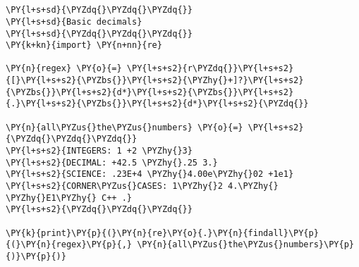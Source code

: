 

\section*{}

\begin{Verbatim}[commandchars=\\\{\}]
\PY{l+s+sd}{\PYZdq{}\PYZdq{}\PYZdq{}}
\PY{l+s+sd}{Basic decimals}
\PY{l+s+sd}{\PYZdq{}\PYZdq{}\PYZdq{}}
\PY{k+kn}{import} \PY{n+nn}{re}

\PY{n}{regex} \PY{o}{=} \PY{l+s+s2}{r\PYZdq{}}\PY{l+s+s2}{[}\PY{l+s+s2}{\PYZbs{}}\PY{l+s+s2}{\PYZhy{}+]?}\PY{l+s+s2}{\PYZbs{}}\PY{l+s+s2}{d*}\PY{l+s+s2}{\PYZbs{}}\PY{l+s+s2}{.}\PY{l+s+s2}{\PYZbs{}}\PY{l+s+s2}{d*}\PY{l+s+s2}{\PYZdq{}}

\PY{n}{all\PYZus{}the\PYZus{}numbers} \PY{o}{=} \PY{l+s+s2}{\PYZdq{}\PYZdq{}\PYZdq{}}
\PY{l+s+s2}{INTEGERS: 1 +2 \PYZhy{}3}
\PY{l+s+s2}{DECIMAL: +42.5 \PYZhy{}.25 3.}
\PY{l+s+s2}{SCIENCE: .23E+4 \PYZhy{}4.00e\PYZhy{}02 +1e1}
\PY{l+s+s2}{CORNER\PYZus{}CASES: 1\PYZhy{}2 4.\PYZhy{} \PYZhy{}E1\PYZhy{} C++ .}
\PY{l+s+s2}{\PYZdq{}\PYZdq{}\PYZdq{}}

\PY{k}{print}\PY{p}{(}\PY{n}{re}\PY{o}{.}\PY{n}{findall}\PY{p}{(}\PY{n}{regex}\PY{p}{,} \PY{n}{all\PYZus{}the\PYZus{}numbers}\PY{p}{)}\PY{p}{)}
\end{Verbatim}

